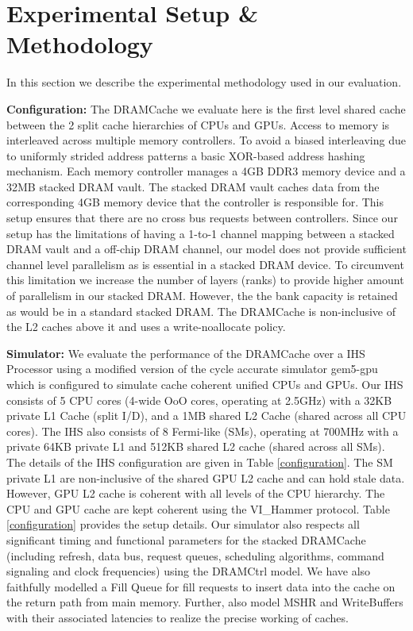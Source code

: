 \section{Experimental Setup \& Methodology} \label{methodology}
In this section we describe the experimental methodology used in our evaluation. 

\par \textbf{\cachename Configuration:} The DRAMCache we evaluate here is the first level shared cache between the 2 split cache hierarchies of CPUs and GPUs. Access to memory is interleaved across multiple memory controllers. To avoid a biased interleaving due to uniformly strided address patterns a basic XOR-based address hashing mechanism. Each memory controller manages a 4GB DDR3 memory device and a 32MB stacked DRAM vault. The stacked DRAM vault caches data from the corresponding 4GB memory device that the controller is responsible for. This setup ensures that there are no cross bus requests between controllers. Since our setup has the limitations of having a 1-to-1 channel mapping between a stacked DRAM vault and a off-chip DRAM channel, our model does not provide sufficient channel level parallelism as is essential in a stacked DRAM device. To circumvent this limitation we increase the number of layers (ranks) to provide higher amount of parallelism in our stacked DRAM. However, the the bank capacity is retained as would be in a standard stacked DRAM. The DRAMCache is non-inclusive  \cite{coherence-dramcache} of the L2 caches above it and uses a write-noallocate policy.

\par \textbf{Simulator:} We evaluate the performance of the DRAMCache over a IHS Processor using a modified version of the cycle accurate simulator gem5-gpu \cite{gem5-gpu} which is configured to simulate cache coherent unified CPUs and GPUs. 
Our IHS consists of 5 CPU cores (4-wide OoO cores, operating at 2.5GHz) with a 32KB private L1 Cache (split I/D), and a 1MB shared L2 Cache (shared across all CPU cores). The IHS also consists of 8 Fermi-like (SMs), operating at 700MHz with a private 64KB private L1 and 512KB shared L2 cache (shared across all SMs). The details of the IHS configuration are given in Table \ref{configuration}. The SM private L1 are non-inclusive of the shared GPU L2 cache and can hold stale data. However, GPU L2 cache is coherent with all levels of the CPU hierarchy. The CPU and GPU cache are kept coherent using the VI\_Hammer protocol\cite{gem5-gpu}. Table \ref{configuration} provides the setup details. 
Our simulator also respects all significant timing and functional parameters for the stacked DRAMCache (including refresh, data bus, request queues, scheduling algorithms, command signaling and clock frequencies) using the DRAMCtrl \cite{dramctrl} model. We have also faithfully modelled  a Fill Queue \cite{dca} for fill requests to insert data into the cache on the return path from main memory. Further, also model MSHR and WriteBuffers with their associated latencies to realize the precise working of caches. 

